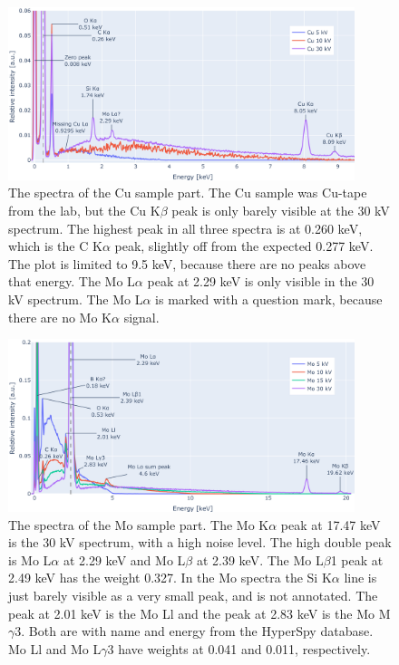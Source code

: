 \begin{figure}[h]
    \centering
    \includegraphics[width=0.90\textwidth]{figures/each_spectra/Cu_everything.png}
    \caption{
        The spectra of the Cu sample part.
        The Cu sample was Cu-tape from the lab, but the Cu K$\beta$ peak is only barely visible at the 30 kV spectrum.
        The highest peak in all three spectra is at 0.260 keV, which is the C K$\alpha$ peak, slightly off from the expected 0.277 keV.
        The plot is limited to 9.5 keV, because there are no peaks above that energy.
        The Mo L$\alpha$ peak at 2.29 keV is only visible in the 30 kV spectrum.
        The Mo L$\alpha$ is marked with a question mark, because there are no Mo K$\alpha$ signal.
    }
    \label{fig:results:Spectra_Cu}
\end{figure}


\begin{figure}[h!]
    \centering
    \includegraphics[width=0.90\textwidth]{figures/each_spectra/Mo_everything.png}
    \caption{
        The spectra of the Mo sample part.
        The Mo K$\alpha$ peak at 17.47 keV is the 30 kV spectrum, with a high noise level.
        The high double peak is Mo L$\alpha$ at 2.29 keV and Mo L$\beta$ at 2.39 keV.
        The Mo L$\beta$1 peak at 2.49 keV has the weight 0.327.
        In the Mo spectra the Si K$\alpha$ line is just barely visible as a very small peak, and is not annotated.
        The peak at 2.01 keV is the Mo Ll and the peak at 2.83 keV is the Mo M$\gamma$3.
        Both are with name and energy from the HyperSpy database.
        Mo Ll and Mo L$\gamma$3 have weights at 0.041 and 0.011, respectively.
    }
    \label{fig:results:Spectra_Mo}
\end{figure}

